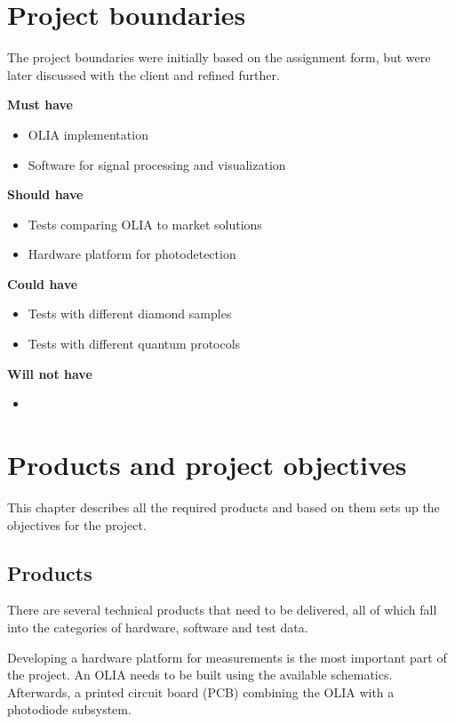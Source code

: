 \documentclass{report}
\begin{document}
	\chapter{Project boundaries} \label{project_boundaries}
	The project boundaries were initially based on the assignment form, but were later discussed with the client and refined further. %
	
	\textbf{Must have}
	\begin{itemize}
		\item OLIA implementation
		\item Software for signal processing and visualization
	\end{itemize}
	
	\textbf{Should have}
	\begin{itemize}
		\item Tests comparing OLIA to market solutions
		\item Hardware platform for photodetection
	\end{itemize}
	
	\textbf{Could have}
	\begin{itemize}
		\item Tests with different diamond samples
		\item Tests with different quantum protocols
	\end{itemize}
	
	\textbf{Will not have}
	\begin{itemize}
		\item 
	\end{itemize}
	
	
	\chapter{Products and project objectives}
	This chapter describes all the required products and based on them sets up the objectives for the project.
	
	\section{Products}
	There are several technical products that need to be delivered, all of which fall into the categories of hardware, software and test data.
	
	Developing a hardware platform for measurements is the most important part of the project. An OLIA needs to be built using the available schematics. Afterwards, a printed circuit board (PCB) combining the OLIA with a photodiode subsystem.
	
\end{document}
